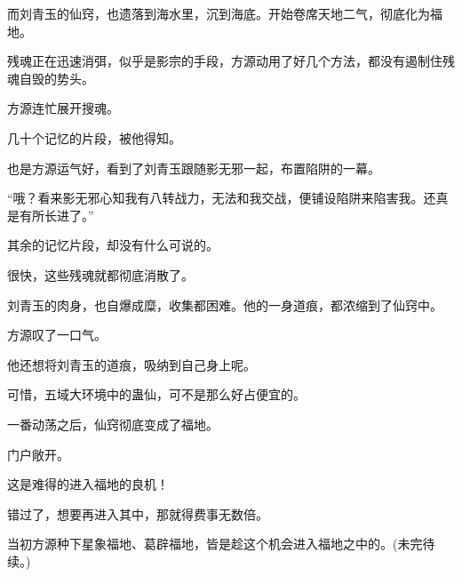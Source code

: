 \begin{this_body}
而刘青玉的仙窍，也遗落到海水里，沉到海底。开始卷席天地二气，彻底化为福地。

残魂正在迅速消弭，似乎是影宗的手段，方源动用了好几个方法，都没有遏制住残魂自毁的势头。

方源连忙展开搜魂。

几十个记忆的片段，被他得知。

也是方源运气好，看到了刘青玉跟随影无邪一起，布置陷阱的一幕。

“哦？看来影无邪心知我有八转战力，无法和我交战，便铺设陷阱来陷害我。还真是有所长进了。”

其余的记忆片段，却没有什么可说的。

很快，这些残魂就都彻底消散了。

刘青玉的肉身，也自爆成糜，收集都困难。他的一身道痕，都浓缩到了仙窍中。

方源叹了一口气。

他还想将刘青玉的道痕，吸纳到自己身上呢。

可惜，五域大环境中的蛊仙，可不是那么好占便宜的。

一番动荡之后，仙窍彻底变成了福地。

门户敞开。

这是难得的进入福地的良机！

错过了，想要再进入其中，那就得费事无数倍。

当初方源种下星象福地、葛辟福地，皆是趁这个机会进入福地之中的。(未完待续。)

\end{this_body}

